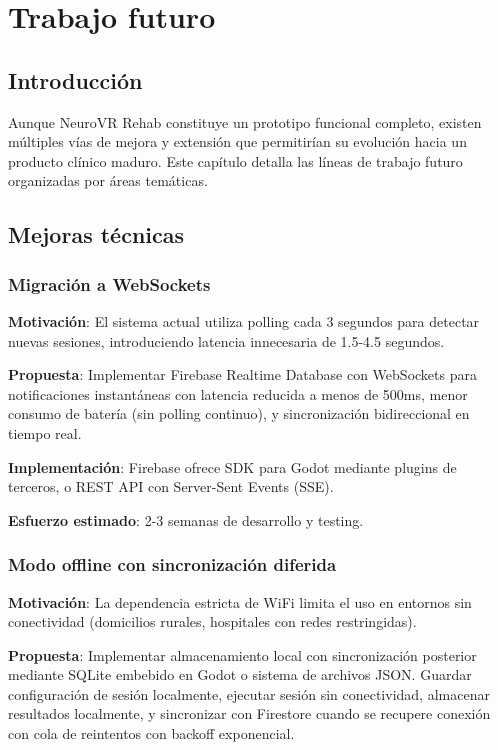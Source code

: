 \chapter{Trabajo futuro}

\section{Introducción}

Aunque NeuroVR Rehab constituye un prototipo funcional completo, existen múltiples vías de mejora y extensión que permitirían su evolución hacia un producto clínico maduro. Este capítulo detalla las líneas de trabajo futuro organizadas por áreas temáticas.

\section{Mejoras técnicas}

\subsection{Migración a WebSockets}

\textbf{Motivación}: El sistema actual utiliza polling cada 3 segundos para detectar nuevas sesiones, introduciendo latencia innecesaria de 1.5-4.5 segundos.

\textbf{Propuesta}: Implementar Firebase Realtime Database con WebSockets para notificaciones instantáneas con latencia reducida a menos de 500ms, menor consumo de batería (sin polling continuo), y sincronización bidireccional en tiempo real.

\textbf{Implementación}: Firebase ofrece SDK para Godot mediante plugins de terceros, o REST API con Server-Sent Events (SSE).

\textbf{Esfuerzo estimado}: 2-3 semanas de desarrollo y testing.

\subsection{Modo offline con sincronización diferida}

\textbf{Motivación}: La dependencia estricta de WiFi limita el uso en entornos sin conectividad (domicilios rurales, hospitales con redes restringidas).

\textbf{Propuesta}: Implementar almacenamiento local con sincronización posterior mediante SQLite embebido en Godot o sistema de archivos JSON. Guardar configuración de sesión localmente, ejecutar sesión sin conectividad, almacenar resultados localmente, y sincronizar con Firestore cuando se recupere conexión con cola de reintentos con backoff exponencial.


